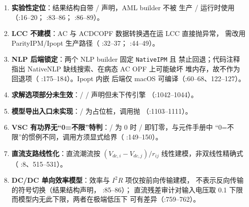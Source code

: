 \begin{enumerate}
  \item \textbf{实验性定位}：结果结构自带
        / 声明，AML builder 不被
        生产 / 运行时使用
        （:16--20；
        :83--86；
        :86--89）。
  \item \textbf{LCC 不建模}：AC 与 ACDCOPF 数据转换遇在运 LCC 直接抛异常，
        需改用 ParityIPM/Ipopt 生产路径（
        :32--37；
        :44--49）。
  \item \textbf{NLP 后端锁定}：两个 NLP builder 固定 \texttt{NativeIPM} 且
        禁止回退；代码注释指出 NativeNLP 缺线搜索、在病态 AC OPF 上可能破坏
        堆内存，故不作为回退项（
        :175--184）。Ipopt 内嵌
        后端仅 macOS 可编译（:60--68、122--127）。
  \item \textbf{求解选项部分未生效}：/
        / 声明但未下传引擎
        （:1042--1044）。
  \item \textbf{模型导出入口未实现}：/
         为占位桩，调用抛 
        （:1103--1111）。
  \item \textbf{VSC 有功界无“0=不限”特判}：/
        为 0 时 / 即钉零，与元件手册中
        “0=不限”的惯例不同，调用方须显式给界（
        :149--150）。
  \item \textbf{直流支路线性化}：直流潮流按 $(V_{dc,i}-V_{dc,j})/r_{ij}$
        线性建模，非双线性精确式（
        :8、515--531）。
  \item \textbf{DC/DC 单向效率模型}：效率与 $I^{2}R$ 项仅按前向传输建模，
        不表示反向传输的符号切换（结果结构声明，
        :85--86）；
        直流残差审计对输入电压取 0.1 下限而模型内无此下限，两者在极端低压下
        可有差异（:759--762）。

\end{enumerate}

